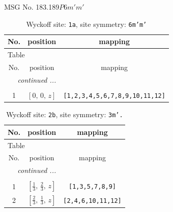 \documentclass[fleqn,8pt]{jsarticle}
\begin{document}
\setcounter{MaxMatrixCols}{32}

\renewcommand{\tablename}{Table~}
\renewcommand{\figurename}{Figure~}
\begin{center}
\LARGE
MSG No. 183.189\quad$P6m'm'$
\end{center}
\renewcommand{\arraystretch}{1.2}
\begin{longtable}{ccc}
\caption{Wyckoff site: {\tt 1a}, site symmetry: {\tt 6m'm'}}
 \\
 \hline \hline
No. & position & mapping \\ \hline \endfirsthead

\multicolumn{2}{l}{\tablename\ \thetable{}} \\
 \hline \hline
No. & position & mapping \\ \hline \endhead

 \hline \hline
\multicolumn{2}{r}{\footnotesize\it continued ...} \\ \endfoot

 \hline \hline
\multicolumn{2}{r}{} \\ \endlastfoot

1 & $\left[ 0,\, 0,\, z \right]$ & {\tt [1,2,3,4,5,6,7,8,9,10,11,12]} \\
\end{longtable}
\renewcommand{\arraystretch}{1.2}
\begin{longtable}{ccc}
\caption{Wyckoff site: {\tt 2b}, site symmetry: {\tt 3m'.}}
 \\
 \hline \hline
No. & position & mapping \\ \hline \endfirsthead

\multicolumn{2}{l}{\tablename\ \thetable{}} \\
 \hline \hline
No. & position & mapping \\ \hline \endhead

 \hline \hline
\multicolumn{2}{r}{\footnotesize\it continued ...} \\ \endfoot

 \hline \hline
\multicolumn{2}{r}{} \\ \endlastfoot

1 & $\left[ \frac{1}{3},\, \frac{2}{3},\, z \right]$ & {\tt [1,3,5,7,8,9]} \\ \hline
2 & $\left[ \frac{2}{3},\, \frac{1}{3},\, z \right]$ & {\tt [2,4,6,10,11,12]} \\
\end{longtable}
\renewcommand{\arraystretch}{1.2}
\end{document}
